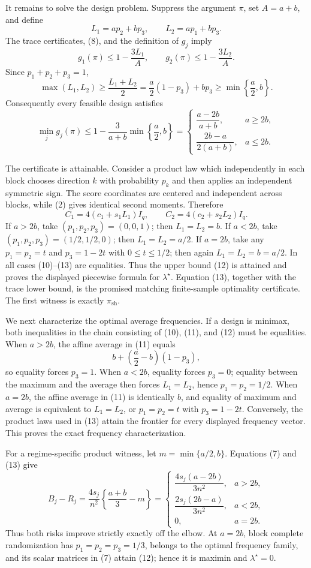 It remains to solve the design problem. Suppress the argument \(\pi\), set \(A=a+b\), and define
\[
L_1=ap_2+bp_3,\qquad L_2=ap_1+bp_3. \tag{9}
\]
The trace certificates, (8), and the definition of \(g_j\) imply
\[
g_1(\pi)\le 1-\frac{3L_1}{A},
\qquad
g_2(\pi)\le 1-\frac{3L_2}{A}. \tag{10}
\]
Since \(p_1+p_2+p_3=1\),
\[
\max(L_1,L_2)
\ge \frac{L_1+L_2}{2}
=\frac a2(1-p_3)+bp_3
\ge \min\left\{\frac a2,b\right\}. \tag{11}
\]
Consequently every feasible design satisfies
\[
\min_j g_j(\pi)
\le 1-\frac{3}{a+b}\min\left\{\frac a2,b\right\}
=
\begin{cases}
\dfrac{a-2b}{a+b},&a\ge 2b,\\[6pt]
\dfrac{2b-a}{2(a+b)},&a\le 2b.
\end{cases} \tag{12}
\]

The certificate is attainable. Consider a product law which independently in each block chooses direction \(k\) with probability \(p_k\) and then applies an independent symmetric sign. The score coordinates are centered and independent across blocks, while (2) gives identical second moments. Therefore
\[
C_1=4(c_1+s_1L_1)I_q,
\qquad
C_2=4(c_2+s_2L_2)I_q. \tag{13}
\]
If \(a>2b\), take \((p_1,p_2,p_3)=(0,0,1)\); then \(L_1=L_2=b\). If \(a<2b\), take \((p_1,p_2,p_3)=(1/2,1/2,0)\); then \(L_1=L_2=a/2\). If \(a=2b\), take any \(p_1=p_2=t\) and \(p_3=1-2t\) with \(0\le t\le 1/2\); then again \(L_1=L_2=b=a/2\). In all cases (10)--(13) are equalities. Thus the upper bound (12) is attained and proves the displayed piecewise formula for \(\lambda^\star\). Equation (13), together with the trace lower bound, is the promised matching finite-sample optimality certificate. The first witness is exactly \(\pi_{\mathrm{sh}}\).

We next characterize the optimal average frequencies. If a design is minimax, both inequalities in the chain consisting of (10), (11), and (12) must be equalities. When \(a>2b\), the affine average in (11) equals
\[
b+\left(\frac a2-b\right)(1-p_3),
\]
so equality forces \(p_3=1\). When \(a<2b\), equality forces \(p_3=0\); equality between the maximum and the average then forces \(L_1=L_2\), hence \(p_1=p_2=1/2\). When \(a=2b\), the affine average in (11) is identically \(b\), and equality of maximum and average is equivalent to \(L_1=L_2\), or \(p_1=p_2=t\) with \(p_3=1-2t\). Conversely, the product laws used in (13) attain the frontier for every displayed frequency vector. This proves the exact frequency characterization.

For a regime-specific product witness, let \(m=\min\{a/2,b\}\). Equations (7) and (13) give
\[
B_j-R_j
=\frac{4s_j}{n^2}\left\{\frac{a+b}{3}-m\right\}
=
\begin{cases}
\dfrac{4s_j(a-2b)}{3n^2},&a>2b,\\[6pt]
\dfrac{2s_j(2b-a)}{3n^2},&a<2b,\\[6pt]
0,&a=2b.
\end{cases} \tag{14}
\]
Thus both risks improve strictly exactly off the elbow. At \(a=2b\), block complete randomization has \(p_1=p_2=p_3=1/3\), belongs to the optimal frequency family, and its scalar matrices in (7) attain (12); hence it is maximin and \(\lambda^\star=0\).

